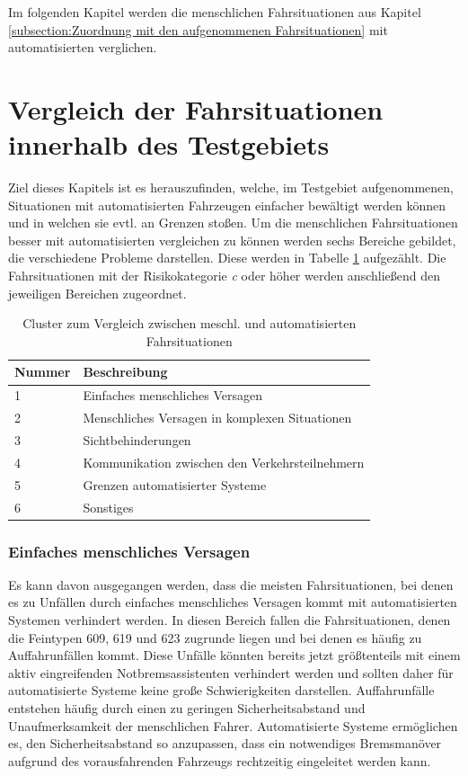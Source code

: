Im folgenden Kapitel werden die menschlichen Fahrsituationen aus Kapitel \ref{subsection:Zuordnung mit den aufgenommenen Fahrsituationen} mit automatisierten verglichen. 

\section{Vergleich der Fahrsituationen innerhalb des Testgebiets}\label{section:Fahrsituationen im Vergleich}
Ziel dieses Kapitels ist es herauszufinden, welche, im Testgebiet aufgenommenen, Situationen  mit automatisierten Fahrzeugen einfacher bewältigt werden können und in welchen sie evtl. an Grenzen stoßen.
Um die menschlichen Fahrsituationen besser mit automatisierten vergleichen zu können werden sechs Bereiche gebildet, die verschiedene Probleme darstellen. Diese werden in Tabelle \ref{tab:Cluster} aufgezählt. Die Fahrsituationen mit der Risikokategorie \textit{c} oder höher werden anschließend den jeweiligen Bereichen zugeordnet. 

\begin{table}[htpb]
	\scriptsize
	\caption[Cluster zum Vergleich zwischen meschl. und automatisierten Fahrsituationen]{Cluster zum Vergleich zwischen meschl. und automatisierten Fahrsituationen}\label{tab:Cluster}
	\centering
	\begin{tabular}{l l}
		\toprule
		Nummer & Beschreibung \\
		\midrule
		1 & Einfaches menschliches Versagen \\
		2 & Menschliches Versagen in komplexen Situationen \\
		3 & Sichtbehinderungen \\
		4 & Kommunikation zwischen den Verkehrsteilnehmern \\
		5 & Grenzen automatisierter Systeme \\
		6 & Sonstiges \\		 
		\bottomrule
	\end{tabular}
\end{table}

\subsubsection{Einfaches menschliches Versagen}
Es kann davon ausgegangen werden, dass die meisten Fahrsituationen, bei denen es zu Unfällen durch einfaches menschliches Versagen kommt mit automatisierten Systemen verhindert werden. In diesen Bereich fallen die Fahrsituationen, denen die Feintypen 609, 619 und 623 zugrunde liegen und bei denen es häufig zu Auffahrunfällen kommt. Diese Unfälle könnten bereits jetzt größtenteils mit einem aktiv eingreifenden Notbremsassistenten verhindert werden und sollten daher für automatisierte Systeme keine große Schwierigkeiten darstellen. Auffahrunfälle entstehen häufig durch einen zu geringen Sicherheitsabstand und Unaufmerksamkeit der menschlichen Fahrer. Automatisierte Systeme ermöglichen es, den Sicherheitsabstand so anzupassen, dass ein notwendiges Bremsmanöver aufgrund des vorausfahrenden Fahrzeugs rechtzeitig eingeleitet werden kann.

